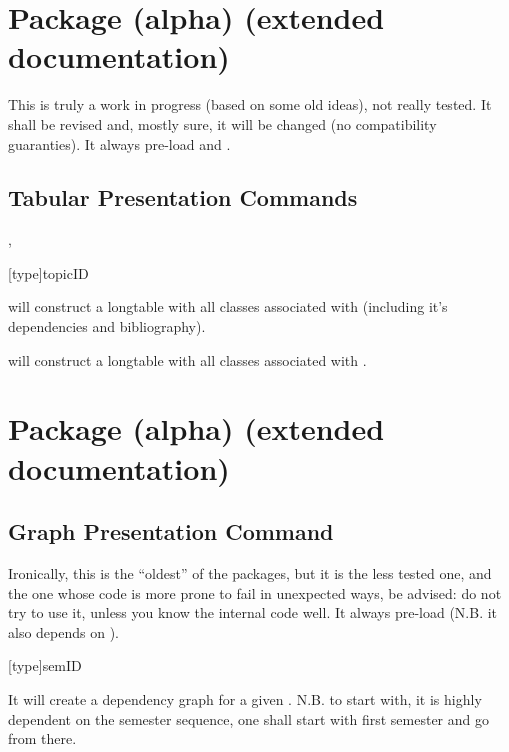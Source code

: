 \documentclass[article,nogeometry,english,tocdepth=3,secdepth=3]{ufrgscca} %
\begin{document}
\section{ Package (alpha) (ex\-tend\-ed documentation)}
This is truly a work in progress (based on some old ideas), not really tested. It shall be revised and, mostly sure, it will be changed (no compatibility guaranties).  It always pre-load  and .

\subsection{Tabular Presentation Commands}
\begin{codedescribe}{\TabEtp,\TabTopic}
    \begin{codesyntax}%
        \tsmacro{\TabTopic}[type]{topicID}
    \end{codesyntax}
\tsmacro{\TabEtp}{} will construct a longtable with all classes associated with  (including it's dependencies and bibliography).

\tsmacro{\TabTopic}{} will construct a longtable with all classes associated with .

\end{codedescribe}

\section{ Package (alpha) (extended documentation)}

\subsection{Graph Presentation Command}
Ironically, this is the “oldest” of the  packages, but it is the less tested one, and the one whose code is more prone to fail in unexpected ways, be advised: do not try to use it, unless you know the internal code well. It always pre-load  (N.B. it also depends on ).

\begin{codedescribe}{\GraphSem}
    \begin{codesyntax}%
        \tsmacro{\GraphSem}[type]{semID}
    \end{codesyntax}
It will create a dependency graph for a given . N.B. to start with, it is highly dependent on the semester sequence, one shall start with first semester and go from there.
\end{codedescribe}

\fi
\end{document}
